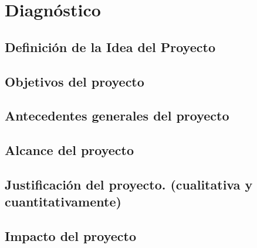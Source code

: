 \section{Diagnóstico}
	\subsection{Definición de la Idea del Proyecto}
	\subsection{Objetivos del proyecto}
	\subsection{Antecedentes generales del proyecto}
	\subsection{Alcance del proyecto}
	\subsection{Justificación del proyecto. (cualitativa y cuantitativamente)}
	\subsection{Impacto del proyecto}
